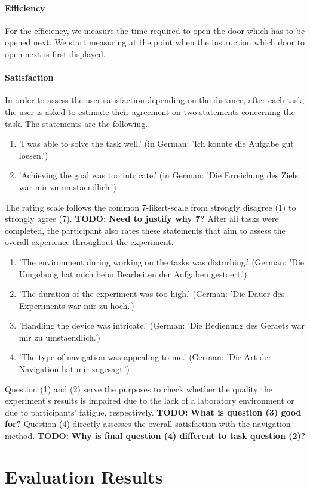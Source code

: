 \documentclass{sig-alternate-05-2015}
\newcommand{\todo}{\textbf{TODO:} \textbf}
\begin{document}
\paragraph{Efficiency} For the efficiency, we measure the time required to open the door which has to be opened next. We start measuring at the point
when the instruction which door to open next is first displayed.
\paragraph{Satisfaction}
In order to assess the user satisfaction depending on the distance, after each task, the user is asked to estimate their
agreement on two statements concerning the task. The statements are the following.
\begin{enumerate}
  \item 'I was able to solve the task well.' (in German: 'Ich konnte die Aufgabe gut loesen.')
  \item 'Achieving the goal was too intricate.' (in German: 'Die Erreichung des Ziels war mir zu umstaendlich.')
\end{enumerate}
The rating scale follows the common 7-likert-scale from strongly disagree (1) to strongly agree (7). \todo{Need to justify why 7?}
After all tasks were completed, the participant also rates these statements that aim to assess the overall experience throughout the experiment.
\begin{enumerate}
  \item 'The environment during working on the tasks was disturbing.' (German: 'Die Umgebung hat mich beim Bearbeiten der Aufgaben gestoert.')
  \item 'The duration of the experiment was too high.' (German: 'Die Dauer des Experiments war mir zu hoch.')
  \item 'Handling the device was intricate.' (German: 'Die Bedienung des Geraets war mir zu umstaendlich.')
  \item 'The type of navigation was appealing to me.' (German: 'Die Art der Navigation hat mir zugesagt.')
\end{enumerate}
Question (1) and (2) serve the purposes to check whether the quality the experiment's results is impaired due to the lack of a laboratory environment or
due to participants' fatigue, respectively. \todo{What is question (3) good for?} Question (4) directly assesses the overall satisfaction with the navigation method.
\todo{Why is final question (4) different to task question (2)?}
\section{Evaluation Results}
\end{document}

